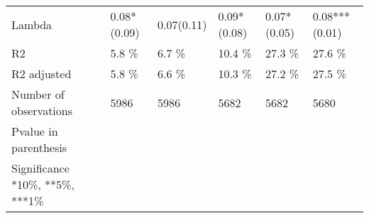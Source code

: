 \begin{tabular}{llllll}
Lambda                          &    0.08*(0.09) &     0.07(0.11) &    0.09*(0.08) &    0.07*(0.05) &  0.08***(0.01) \\
R2                              &          5.8 \% &          6.7 \% &         10.4 \% &         27.3 \% &         27.6 \% \\
R2 adjusted                     &          5.8 \% &          6.6 \% &         10.3 \% &         27.2 \% &         27.5 \% \\
Number of observations          &           5986 &           5986 &           5682 &           5682 &           5680 \\
Pvalue in parenthesis           &                &                &                &                &                \\
Significance *10\%, **5\%, ***1\%  &                &                &                &                &                \\
\bottomrule
\end{tabular}
